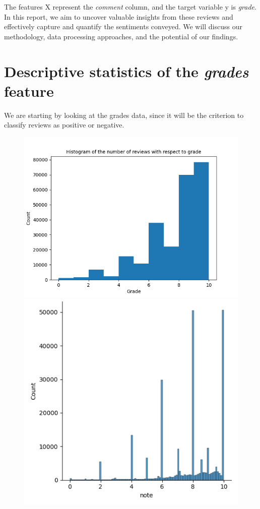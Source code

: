 \documentclass{article}
\begin{document}
The features X represent the \textit{comment} column, and the target variable y is \textit{grade}. In this report, we aim to uncover valuable insights from these reviews and effectively capture and quantify the sentiments conveyed. We will discuss our methodology, data processing approaches, and the potential of our findings.

\newpage
\section{Descriptive statistics of the \textit{grades} feature}

We are starting by looking at the grades data, since it will be the criterion to classify reviews as positive or negative.
\begin{figure}[H]
  \centering
  \begin{minipage}[t]{0.49\linewidth}
    \centering
    \includegraphics[width=\linewidth]{hist_plot_count.png}
  \end{minipage}\hfill
  \begin{minipage}[t]{0.49\linewidth}
    \centering
    \includegraphics[width=\linewidth]{dist_plot_count.png}

\end{minipage}
\end{figure}
\end{document}
